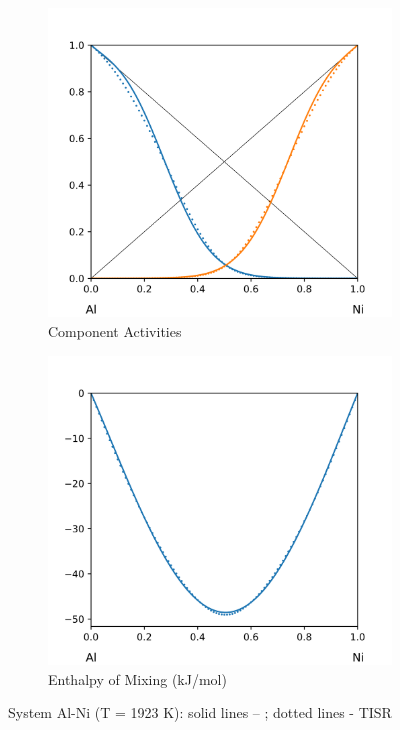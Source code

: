 \documentclass[12pt,abstract]{scrartcl}
\begin{document}
\begin{figure}
\centering
\begin{subfigure}{.5\textwidth}
  \centering
  \includegraphics[width=1\linewidth]{Al-Ni_Activity}
  \caption{Component Activities}
  \label{fig:sub1}
\end{subfigure}%
\begin{subfigure}{.5\textwidth}
  \centering
  \includegraphics[width=1\linewidth]{Al-Ni_Enthalpy}
  \caption{Enthalpy of Mixing (kJ/mol)}
  \label{fig:sub2}
\end{subfigure}
\caption{System Al-Ni (T = 1923 K): solid lines -- \cite{Al-Ni_Data}; dotted lines - TISR}
\label{fig:Al-Ni}
\end{figure}
\end{document}
